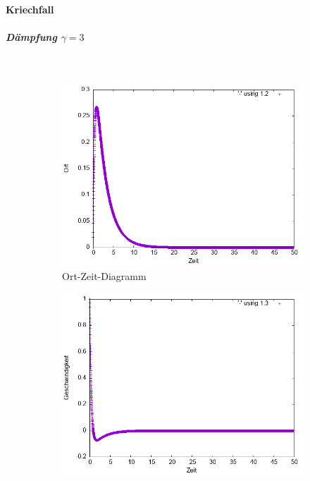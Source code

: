 \documentclass[
    oneside,
    ngerman,
    footinclude=false,
    captions=tableheading,
    DIV=12
]{scrartcl}
\begin{document}
            \paragraph{Kriechfall}
                \subparagraph{Dämpfung $\gamma=3$}\,
                \begin{figure}[H]
                    \centering
                    \begin{subfigure}[b]{0.45\textwidth}
                        \centering
                        \includegraphics[width=\textwidth]{Bilddateien/VVA1(b)-001-3-x.png}
                        \caption{Ort-Zeit-Diagramm}
                        \label{fig:VVA1(a)-001-3-x}
                    \end{subfigure}
                    \hfill
                    \begin{subfigure}[b]{0.45\textwidth}
                        \centering
                        \includegraphics[width=\textwidth]{Bilddateien/VVA1(b)-001-3-v.png}

\end{subfigure}
\end{figure}
\end{document}
